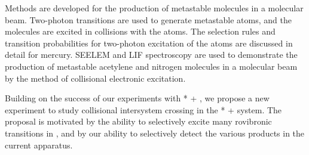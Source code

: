 


Methods are developed for the production of metastable molecules in a
molecular beam.  Two-photon transitions are used to generate
metastable atoms, and the molecules are excited in collisions with the
atoms.  The selection rules and transition probabilities for
two-photon excitation of the atoms are discussed in detail for
mercury.  SEELEM and LIF spectroscopy are used to demonstrate the
production of metastable acetylene and nitrogen molecules in a
molecular beam by the method of collisional electronic excitation.

Building on the success of our experiments with * + , we
propose a new experiment to study collisional intersystem crossing in
the * +  system.  The proposal is motivated by the
ability to selectively excite many rovibronic transitions in ,
and by our ability to selectively detect the various products in the
current apparatus.






